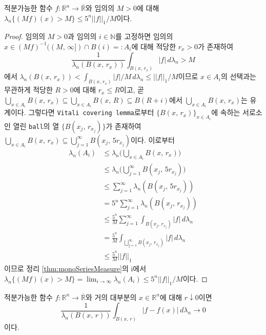 \begin{lemma}
    적분가능한 함수 $f:\mathbb{R}^n\to\overline{\mathbb{R}}$와 임의의 $M>0$에 대해 $\lambda_n\{(Mf)(x)>M\}\leq5^n||f||_1/M$이다.
\end{lemma}

\begin{proof}
    임의의 $M>0$과 임의의 $i\in\mathbb{N}$를 고정하면 임의의 $x\in(Mf)^{-1}((M,\,\infty])\cap B(i)=:A_i$에 대해 적당한 $r_x>0$가 존재하여
    \begin{equation*}
        \frac{1}{\lambda_n(B(x,\,r_x))}\int_{B(x,\,r_x)}|f|\,d\lambda_n>M
    \end{equation*}
    에서 $\lambda_n(B(x,\,r_x))<\int_{B(x,\,r_x)}|f|/M\,d\lambda_n\leq||f||_1/M$이므로 $x\in A_i$의 선택과는 무관하게 적당한 $R>0$에 대해 $r_x\leq R$이고, 곧 $\bigcup_{x\in A_i}B(x,\,r_x)\subseteq\bigcup_{x\in A_i}B(x,\,R)\subseteq B(R+i)$에서 $\bigcup_{x\in A_i}B(x,\,r_x)$는 유계이다. 그렇다면 \texttt{Vitali covering lemma}로부터 $\{B(x,\,r_x)\}_{x\in A_i}$에 속하는 서로소인 열린 \texttt{ball}의 열 $\{B(x_j,\,r_{x_j})\}$가 존재하여 $\bigcup_{x\in A_i}B(x,\,r_x)\subseteq\bigcup_{j=1}^\infty B(x_j,\,5r_{x_j})$이다. 이로부터
    \begin{align*}
        \lambda_n(A_i)&\leq\lambda_n\bigg(\bigcup_{x\in A_i}B(x,\,r_x)\bigg)\\
        &\leq\lambda_n\bigg(\bigcup_{j=1}^\infty B(x_j,\,5r_{x_j})\bigg)\\
        &\leq\sum_{j=1}^\infty\lambda_n(B(x_j,\,5r_{x_j}))\\
        &=5^n\sum_{j=1}^\infty\lambda_n(B(x_j,\,r_{x_j}))\\
        &\leq\frac{5^n}{M}\sum_{j=1}^\infty\int_{B(x_j,\,r_{x_j})}|f|\,d\lambda_n\\
        &=\frac{5^n}{M}\int_{\bigsqcup_{j=1}^\infty B(x_j,\,r_{x_j})}|f|\,d\lambda_n\\
        &\leq\frac{5^n}{M}||f||_1
    \end{align*}
    이므로 정리 \ref{thm:monoSeriesMeasure}의 i에서 $\lambda_n\{(Mf)(x)>M\}=\lim_{i\to\infty}\lambda_n(A_i)\leq5^n||f||_1/M$이다.
\end{proof}

\begin{theorem}
    적분가능한 함수 $f:\mathbb{R}^n\to\overline{\mathbb{R}}$와 거의 대부분의 $x\in\mathbb{R}^n$에 대해 $r\downarrow0$이면
    \begin{equation*}
        \frac{1}{\lambda_n(B(x,\,r))}\int_{B(x,\,r)}|f-f(x)|\,d\lambda_n\to0
    \end{equation*}
    이다.
\end{theorem}

